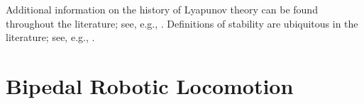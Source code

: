 Additional information on the history of Lyapunov theory can be found throughout
the literature; see, e.g., \cite{Michel2007,Teel1999}.
%
Definitions of stability are ubiquitous in the literature; see, e.g.,
\cite{Khalil2002,Teschl2012,Vidyasagar1993}.

\section{Bipedal Robotic Locomotion}











